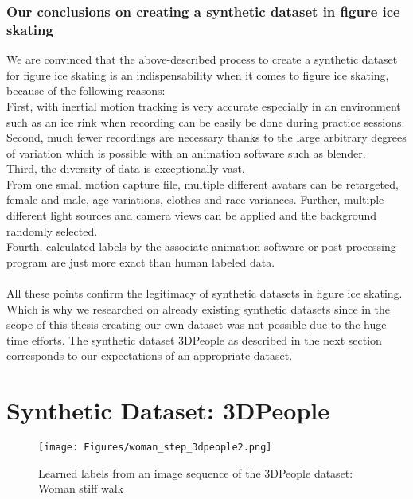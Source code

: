 \subsubsection*{Our conclusions on creating a synthetic dataset in figure ice skating}
We are convinced that the above-described process to create a synthetic dataset for figure ice skating is an
indispensability when it comes to figure ice skating,
because of the following reasons:\\
First, with inertial motion tracking is very accurate especially in an environment such as an ice rink when recording
can be easily be done during practice sessions.\\
Second, much fewer recordings are necessary thanks to the large arbitrary degrees of variation which is possible with
an animation software such as blender.\\
Third, the diversity of data is exceptionally vast.\\
From one small motion capture file, multiple different avatars can be retargeted, female and male, age variations,
clothes and race variances.
Further, multiple different light sources and camera views can be applied and the background randomly selected.\\
Fourth, calculated labels by the associate animation software or post-processing program are just more exact than
human labeled data.
\\\mbox{}\\
All these points confirm the legitimacy of synthetic datasets in figure ice skating.
Which is why we researched on already existing synthetic datasets since in the scope of this thesis creating our own
dataset was not possible due to the huge time efforts.
The synthetic dataset 3DPeople as described in the next section corresponds to our expectations of an appropriate dataset.




\section{Synthetic Dataset: 3DPeople}

\begin{figure}
    \centering
    \texttt{[image: Figures/woman\_step\_3dpeople2.png]}
    \decoRule
    \caption[3DPeople: Woman stiff walk (labeled)]{Learned labels from an image sequence of the 3DPeople dataset: Woman stiff walk}
    \label{fig:woman_step_3dpeople}
\end{figure}


